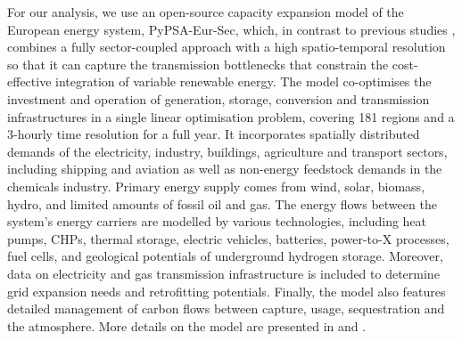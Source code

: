 

For our analysis, we use an open-source capacity expansion model of the European
energy system, PyPSA-Eur-Sec, which, in contrast to previous studies
\cite{henningComprehensiveModel2014,mathiesenSmartEnergy2015,connollySmartEnergy2016,lofflerDesigningModel2017,blancoPotentialHydrogen2018,brownSynergiesSector2018,in-depth_2018,victoria2020},
combines a fully sector-coupled approach with a high spatio-temporal resolution
so that it can capture the transmission bottlenecks that constrain the
cost-effective integration of variable renewable energy. The model co-optimises
the investment and operation of generation, storage, conversion and transmission
infrastructures in a single linear optimisation problem, covering 181 regions
and a 3-hourly time resolution for a full year. It incorporates spatially
distributed demands of the electricity, industry, buildings, agriculture and
transport sectors, including shipping and aviation as well as non-energy
feedstock demands in the chemicals industry. Primary energy supply comes from
wind, solar, biomass, hydro, and limited amounts of fossil oil and gas. The
energy flows between the system's energy carriers are modelled by various
technologies, including heat pumps, CHPs, thermal storage, electric vehicles,
batteries, power-to-X processes, fuel cells, and geological potentials of
underground hydrogen storage. Moreover, data on electricity and gas transmission
infrastructure is included to determine grid expansion needs and retrofitting
potentials. Finally, the model also features detailed management of carbon flows
between capture, usage, sequestration and the atmosphere. More details on the
model are presented in  and .



